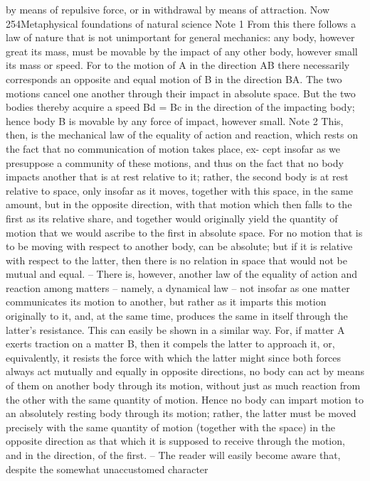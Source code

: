 by means of repulsive force, or in withdrawal by means of attraction. Now
254Metaphysical foundations of natural science
Note 1
From this there follows a law of nature that is not unimportant for
general mechanics: any body, however great its mass, must be movable
by the impact of any other body, however small its mass or speed. For
to the motion of A in the direction AB there necessarily corresponds an
opposite and equal motion of B in the direction BA. The two motions
cancel one another through their impact in absolute space. But the two
bodies thereby acquire a speed Bd = Bc in the direction of the impacting
body; hence body B is movable by any force of impact, however small.
Note 2
This, then, is the mechanical law of the equality of action and reaction,
which rests on the fact that no communication of motion takes place, ex-
cept insofar as we presuppose a community of these motions, and thus on
the fact that no body impacts another that is at rest relative to it; rather, the
second body is at rest relative to space, only insofar as it moves, together
with this space, in the same amount, but in the opposite direction, with
that motion which then falls to the ﬁrst as its relative share, and together
would originally yield the quantity of motion that we would ascribe to
the ﬁrst in absolute space. For no motion that is to be moving with respect
to another body, can be absolute; but if it is relative with respect to the
latter, then there is no relation in space that would not be mutual and
equal. – There is, however, another law of the equality of action and
reaction among matters – namely, a dynamical law – not insofar as one
matter communicates its motion to another, but rather as it imparts this
motion originally to it, and, at the same time, produces the same in itself
through the latter’s resistance. This can easily be shown in a similar way.
For, if matter A exerts traction on a matter B, then it compels the latter to
approach it, or, equivalently, it resists the force with which the latter might
since both forces always act mutually and equally in opposite directions, no
body can act by means of them on another body through its motion, without
just as much reaction from the other with the same quantity of motion. Hence
no body can impart motion to an absolutely resting body through its motion;
rather, the latter must be moved precisely with the same quantity of motion
(together with the space) in the opposite direction as that which it is supposed
to receive through the motion, and in the direction, of the ﬁrst. – The reader
will easily become aware that, despite the somewhat unaccustomed character
